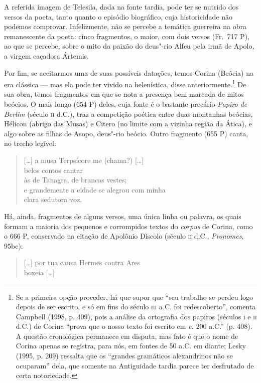 A referida imagem de Telesila, dada na fonte tardia, pode ter se nutrido dos
versos da poeta, tanto quanto o episódio biográfico, cuja historicidade não
podemos comprovar. Infelizmente, não se percebe a temática guerreira na obra
remanescente da poeta: cinco fragmentos, o maior, com dois versos (Fr.~717 P),
ao que se percebe, sobre o mito da paixão do deus"-rio Alfeu pela irmã de Apolo,
a virgem caçadora Ártemis.

Por fim, se aceitarmos uma de suas possíveis datações, temos Corina (Beócia) na
era clássica --- mas ela pode ter vivido na helenística, disse
anteriormente.\footnote{ Se a primeira opção proceder, há que supor que “seu
trabalho se perdeu logo depois de ser escrito, e só em fins do século \textsc{iii} a.C.
foi redescoberto”, comenta Campbell (1998, p. 409), pois a análise da
ortografia dos papiros (séculos \textsc{i} e \textsc{ii} d.C.) de Corina “prova que o nosso texto
foi escrito em \textit{c.} 200 a.C.” (p. 408). A questão cronológica permanece
em disputa, mas fato é que o nome de Corina apenas se registra, para nós, em
fontes de 50 a.C. em diante; Lesky (1995, p. 209) ressalta que os “grandes
gramáticos alexandrinos não se ocuparam” dela, que somente na Antiguidade
tardia parece ter desfrutado de certa notoriedade.} De sua obra, temos
fragmentos em que se nota a presença bem marcada de mitos beócios. O mais longo
(654 P) deles, cuja fonte é o bastante precário \textit{Papiro de Berlim}
(século \textsc{ii} d.C.), traz a competição poética entre duas montanhas beócias,
Hélicon (abrigo das Musas) e Citero (no limite com a vizinha região da Ática),
e algo sobre as filhas de Asopo, deus"-rio beócio. Outro fragmento (655 P)
canta, no trecho legível:

\begin{quote}
\mbox[\ldots{}] a musa Terpsícore me (chama?) [\ldots{}]\\
belos contos cantar\\
às de Tanagra, de brancas vestes;\\
e grandemente a cidade se alegrou com minha\\
clara sedutora voz.
\end{quote}

Há, ainda, fragmentos de alguns versos, uma única linha ou palavra, os quais
formam a maioria dos pequenos e corrompidos textos do \textit{corpus} de
Corina, como o 666 P, conservado na citação de Apolônio Díscolo (século \textsc{ii}
d.C., \textit{Pronomes}, 95bc):

\begin{quote}
\mbox[\ldots{}] por tua causa Hermes contra Ares\\
boxeia [\ldots{}]
\end{quote}

